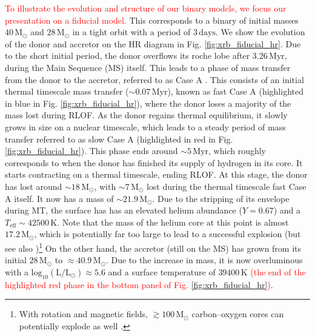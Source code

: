\documentclass[linenumbers,trackchanges,twocolumn]{aastex701}
\newcommand{\Mdot}{\mathrm{M}_{\odot}}
\newcommand{\Ldot}{\mathrm{L}_{\odot}}
\newcommand{\red}{\textcolor{red}}
\begin{document}
\red{To illustrate the evolution and structure of our binary models, we focus our presentation on a fiducial model.} This corresponds to a binary of initial masses $40\,\Mdot$ and $28\,\Mdot$ in a tight orbit with a period of $3\,\mathrm{days}$. We show the evolution of the donor and accretor on the HR diagram in Fig. \ref{fig:xrb_fiducial_hr}. Due to the short initial period, the donor overflows its roche lobe after $3.26 \,\mathrm{Myr}$, during the Main Sequence (MS) itself. This leads to a phase of mass transfer from the donor to the accretor, referred to as Case A \citep{1967ZA.....65..251K}. This consists of an initial thermal timescale mass transfer ($\sim 0.07\, \mathrm{Myr}$), known as fast Case A (highlighted in blue in Fig. \ref{fig:xrb_fiducial_hr}), where the donor loses a majority of the mass lost during RLOF. As the donor regains thermal equilibrium, it slowly grows in size on a nuclear timescale, which leads to a steady period of mass transfer referred to as slow Case A (highlighted in red in Fig. \ref{fig:xrb_fiducial_hr}). This phase ends around $\sim 5\,\mathrm{Myr}$, which roughly corresponds to when the donor has finished its supply of hydrogen in its core. It starts contracting on a thermal timescale, ending RLOF. At this stage, the donor has lost around $\sim 18\,\Mdot$, with $\sim 7\,\Mdot$ lost during the thermal timescale fast Case A itself. It now has a mass of $\sim 21.9\,\Mdot$. Due to the stripping of its envelope during MT, the surface has has an elevated helium abundance ($Y = 0.67$) and a $T_{\mathrm{eff}} \sim 42500\,\mathrm{K}$. Note that the mass of the helium core at this point is almost $17.2\,\Mdot$, which is potentially far too large to lead to a successful explosion \citep{2012ApJ...749...91F} (but see also \cite{2018MNRAS.477L..80K,2023ApJ...957...68B,2024ApJ...964L..16B,2025ApJ...987..164B})\footnote{With rotation and magnetic fields, $\gtrsim 100\,\Mdot$ carbon--oxygen cores can potentially explode as well \citep{2022ApJ...941..100S,2025arXiv250815887G}.} On the other hand, the accretor (still on the MS) has grown from its initial $28\,\Mdot$ to $\approx 40.9\,\Mdot$. Due to the increase in mass, it is now overluminous with a $\mathrm{log_{10}}(\mathrm{L}/\Ldot) \approx 5.6$ and a surface temperature of $39400\,\mathrm{K}$ \red{(the end of the highlighted red phase in the bottom panel of Fig. \ref{fig:xrb_fiducial_hr})}.
\end{document}
